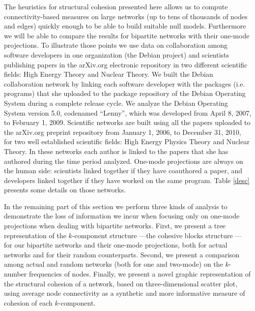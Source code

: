The heuristics for structural cohesion presented here allows us to compute connectivity-based measures on large networks (up to tens of thousands of nodes and edges) quickly enough to be able to build suitable null models.  Furthermore we will be able to compare the results for bipartite networks with their one-mode projections. To illustrate those points we use data on collaboration among software developers in one organization (the Debian project) and scientists publishing papers in the arXiv.org electronic repository in two different scientific fields: High Energy Theory and Nuclear Theory. We built the Debian collaboration network by linking each software developer with the packages (i.e. programs) that she uploaded to the package repository of the Debian Operating System during a complete release cycle. We analyze the Debian Operating System version 5.0, codenamed ``Lenny'', which was developed from April 8, 2007, to February 1, 2009. Scientific networks are built using all the papers uploaded to the arXiv.org preprint repository from January 1, 2006, to December 31, 2010, for two well established scientific fields: High Energy Physics Theory and Nuclear Theory. In these networks each author is linked to the papers that she has authored during the time period analyzed. One-mode projections are always on the human side: scientists linked together if they have coauthored a paper, and developers linked together if they have worked on the same program. Table \ref{desc} presents some details on those networks.

In the remaining part of this section we perform three kinds of analysis to demonstrate the loss of information we incur when focusing only on one-mode projections when dealing with bipartite networks. First, we present a tree representation of the $k$-component structure ---the cohesive blocks structure \citep{white:2001,moody:2003,white:2004,mani:2014}--- for our bipartite networks and their one-mode projections, both for actual networks and for their random counterparts. Second, we present a comparison among actual and random networks (both for one and two-mode) on the $k$-number frequencies of nodes. Finally, we present a novel graphic representation of the structural cohesion of a network, based on three-dimensional scatter plot, using average node connectivity as a synthetic and more informative measure of cohesion of each $k$-component.


